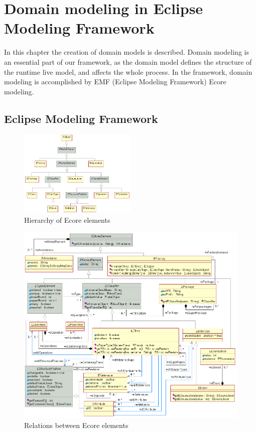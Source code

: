 \chapter{Domain modeling in Eclipse Modeling Framework}
\label{chapter:emf}

In this chapter the creation of domain models is described.
Domain modeling is an essential part of our framework, as the domain model defines the structure of the runtime live model, and affects the whole process. 
In the framework, domain modeling is accomplished by EMF (Eclipse Modeling Framework) Ecore modeling.

\section{Eclipse Modeling Framework}


\begin{figure}
	\begin{center}
		\includegraphics[width=0.5\textwidth]{figures/EcoreHierarchy.png}
		\caption{Hierarchy of Ecore elements \cite{ecore-package} }
		\label{fig:ecore-hierarchy}
	\end{center}
\end{figure}

\begin{figure}
	\begin{center}
		\includegraphics[width=\textwidth]{figures/EcoreRelations.png}
		\caption{Relations between Ecore elements \cite{ecore-package} }
		\label{fig:ecore-relations}
	\end{center}
\end{figure}

